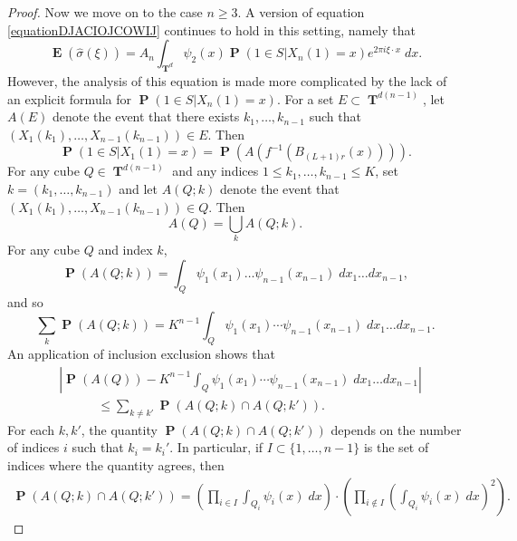 \documentclass[12pt,reqno]{article}
\numberwithin{equation}{section}
\DeclareMathOperator{\TT}{\mathbf{T}}
\numberwithin{theorem}{section}
\DeclareMathOperator{\EE}{\mathbf{E}}
\DeclareMathOperator{\PP}{\mathbf{P}}
\begin{document}
\begin{proof}
    Now we move on to the case $n \geq 3$. A version of equation \eqref{equationDJACIOJCOWIJ} continues to hold in this setting, namely that
    \begin{equation}
        \EE(\widehat{\sigma}(\xi)) = A_n \int_{\TT^d} \psi_2(x) \PP(1 \in S| X_n(1) = x) e^{2 \pi i \xi \cdot x}\; dx.
    \end{equation}
    However, the analysis of this equation is made more complicated by the lack of an explicit formula for $\PP(1 \in S|X_n(1) = x)$. For a set $E \subset \TT^{d(n-1)}$, let $A(E)$ denote the event that there exists $k_1,\dots,k_{n-1}$ such that $(X_1(k_1),\dots,X_{n-1}(k_{n-1})) \in E$. Then
    \begin{equation}
        \PP( 1 \in S | X_1(1) = x ) = \PP(A(f^{-1}(B_{(L+1)r}(x)))).
    \end{equation}
    For any cube $Q \in \TT^{d(n-1)}$ and any indices $1 \leq k_1,\dots,k_{n-1} \leq K$, set $k = (k_1,\dots,k_{n-1})$ and let $A(Q;k)$ denote the event that $(X_1(k_1),\dots,X_{n-1}(k_{n-1})) \in Q$. Then
    \[ A(Q) = \bigcup_k A(Q;k). \]
    For any cube $Q$ and index $k$,
    \begin{equation}
        \PP(A(Q;k)) = \int_Q \psi_1(x_1) \dots \psi_{n-1}(x_{n-1})\; dx_1 \dots dx_{n-1},
    \end{equation}
    and so
    \begin{equation}
        \sum_k \PP(A(Q;k)) = K^{n-1} \int_Q \psi_1(x_1) \cdots \psi_{n-1}(x_{n-1})\; dx_1 \dots dx_{n-1}.
    \end{equation}
    An application of inclusion exclusion shows that
    \begin{equation}
    \begin{split}
        &\left| \PP(A(Q)) - K^{n-1} \int_Q \psi_1(x_1) \cdots \psi_{n-1}(x_{n-1})\; dx_1 \dots dx_{n-1} \right|\\
        &\quad\quad\quad\leq \sum_{k \neq k'} \PP(A(Q;k) \cap A(Q;k')).
    \end{split}
    \end{equation}
    For each $k,k'$, the quantity $\PP(A(Q;k) \cap A(Q;k'))$ depends on the number of indices $i$ such that $k_i = k_i'$. In particular, if $I \subset \{ 1, \dots, n-1 \}$ is the set of indices where the quantity agrees, then
    \begin{equation}
    \begin{split}
        \PP(A(Q;k) \cap A(Q;k')) = \left( \prod_{i \in I} \int_{Q_i} \psi_i(x)\; dx \right) \cdot \left( \prod_{i \not \in I} \left( \int_{Q_i} \psi_i(x)\; dx \right)^2 \right).

\end{split}
\end{equation}
\end{proof}
\end{document}
